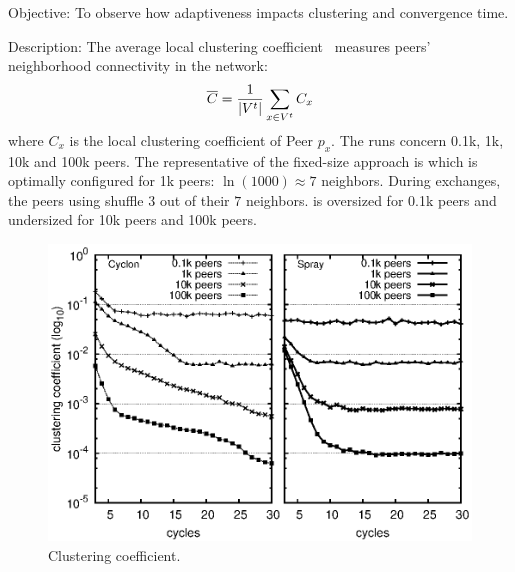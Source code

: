 \begin{asparadesc}
\item[Objective:] To observe how adaptiveness impacts clustering and convergence
  time.
\item[Description:] The average local clustering
  coefficient~\cite{watts1998collective} measures peers' neighborhood
  connectivity in the network:
  \begin{equation*}
    \overline{C} = {1\over |V^t|}\sum\limits_{x\in V^t}C_x
  \end{equation*}
  where $C_x$ is the local clustering coefficient of Peer $p_x$.  The
  runs concern 0.1k, 1k, 10k and 100k peers. The representative of the
  fixed-size approach is \CYCLON which is optimally configured for 1k
  peers: $\ln(1000)\approx 7$ neighbors. During exchanges, the peers
  using \CYCLON shuffle $3$ out of their $7$ neighbors. \CYCLON is
  oversized for 0.1k peers and undersized for 10k peers and 100k
  peers.

\begin{figure}
  \centering
  \includegraphics[width=\SCALE\textwidth]{img/simple.eps}
  \caption{\label{fig:clustering}Clustering coefficient.}
\end{figure}


\end{asparadesc}
